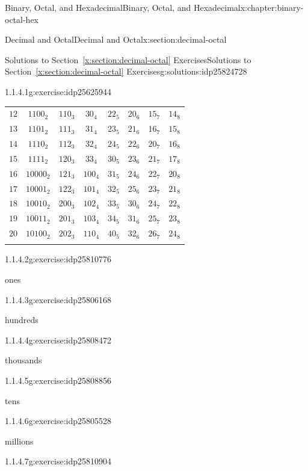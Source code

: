 \documentclass[twoside,10pt,]{book}
\newcommand{\xreffont}{\relax}
\numberwithin{equation}{section}
\newcommand{\hrulethin}  {\noalign{\hrule height 0.04em}}
\newcommand{\hrulethick} {\noalign{\hrule height 0.11em}}
\begin{document}
\begin{chapterptx}{Binary, Octal, and Hexadecimal}{}{Binary, Octal, and Hexadecimal}{}{}{x:chapter:binary-octal-hex}
\begin{sectionptx}{Decimal and Octal}{}{Decimal and Octal}{}{}{x:section:decimal-octal}
\begin{solutions-subsection}{Solutions to Section~{\xreffont\ref*{x:section:decimal-octal}} Exercises}{}{Solutions to Section~{\xreffont\ref*{x:section:decimal-octal}} Exercises}{}{}{g:solutions:idp25824728}
\begin{divisionsolution}{1.1.4.1}{}{g:exercise:idp25625944}
\begin{center}
{\begin{tabular}{cccccccc}
\(12\)&\(1100_2\)&\(110_3\)&\(30_4\)&\(22_5\)&\(20_6\)&\(15_7\)&\(14_8\)\tabularnewline\hrulethin
\(13\)&\(1101_2\)&\(111_3\)&\(31_4\)&\(23_5\)&\(21_6\)&\(16_7\)&\(15_8\)\tabularnewline\hrulethin
\(14\)&\(1110_2\)&\(112_3\)&\(32_4\)&\(24_5\)&\(22_6\)&\(20_7\)&\(16_8\)\tabularnewline\hrulethin
\(15\)&\(1111_2\)&\(120_3\)&\(33_4\)&\(30_5\)&\(23_6\)&\(21_7\)&\(17_8\)\tabularnewline\hrulethin
\(16\)&\(10000_2\)&\(121_3\)&\(100_4\)&\(31_5\)&\(24_6\)&\(22_7\)&\(20_8\)\tabularnewline\hrulethin
\(17\)&\(10001_2\)&\(122_3\)&\(101_4\)&\(32_5\)&\(25_6\)&\(23_7\)&\(21_8\)\tabularnewline\hrulethin
\(18\)&\(10010_2\)&\(200_3\)&\(102_4\)&\(33_5\)&\(30_6\)&\(24_7\)&\(22_8\)\tabularnewline\hrulethin
\(19\)&\(10011_2\)&\(201_3\)&\(103_4\)&\(34_5\)&\(31_6\)&\(25_7\)&\(23_8\)\tabularnewline\hrulethin
\(20\)&\(10100_2\)&\(202_3\)&\(110_4\)&\(40_5\)&\(32_6\)&\(26_7\)&\(24_8\)\tabularnewline\hrulethick
\end{tabular}
}%
\end{center}%
%
\end{divisionsolution}%
\begin{exercisegroup}
\begin{divisionsolutioneg}{1.1.4.2}{}{g:exercise:idp25810776}%
\par\smallskip%
\noindent\hypertarget{g:solution:idp25806040-main}{}ones\end{divisionsolutioneg}%
\begin{divisionsolutioneg}{1.1.4.3}{}{g:exercise:idp25806168}%
\par\smallskip%
\noindent\hypertarget{g:solution:idp25807448-main}{}hundreds\end{divisionsolutioneg}%
\begin{divisionsolutioneg}{1.1.4.4}{}{g:exercise:idp25808472}%
\par\smallskip%
\noindent\hypertarget{g:solution:idp25807064-main}{}thousands\end{divisionsolutioneg}%
\begin{divisionsolutioneg}{1.1.4.5}{}{g:exercise:idp25808856}%
\par\smallskip%
\noindent\hypertarget{g:solution:idp25806424-main}{}tens\end{divisionsolutioneg}%
\begin{divisionsolutioneg}{1.1.4.6}{}{g:exercise:idp25805528}%
\par\smallskip%
\noindent\hypertarget{g:solution:idp25809368-main}{}millions\end{divisionsolutioneg}%
\begin{divisionsolutioneg}{1.1.4.7}{}{g:exercise:idp25810904}%

\end{divisionsolutioneg}
\end{exercisegroup}
\end{solutions-subsection}
\end{sectionptx}
\end{chapterptx}
\end{document}
